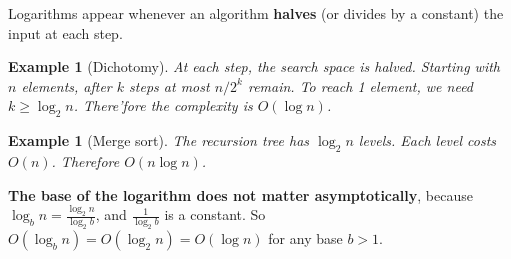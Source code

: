 \documentclass[11pt,a4paper]{article}
\newtheorem{example}[theorem]{Example}
\begin{document}
Logarithms appear whenever an algorithm \textbf{halves} (or divides by a constant) the input at each step.

\begin{example}[Dichotomy]
At each step, the search space is halved. Starting with $n$ elements, after $k$ steps at most $n/2^k$ remain. To reach 1 element, we need $k \geq \log_2 n$. There'fore the complexity is $O(\log n)$.
\end{example}

\begin{example}[Merge sort]
The recursion tree has $\log_2 n$ levels. Each level costs $O(n)$. Therefore $O(n \log n)$.
\end{example}

\textbf{The base of the logarithm does not matter asymptotically}, because $\log_b n = \frac{\log_2 n}{\log_2 b}$, and $\frac{1}{\log_2 b}$ is a constant. So $O(\log_b n) = O(\log_2 n) = O(\log n)$ for any base $b > 1$.
\end{document}

